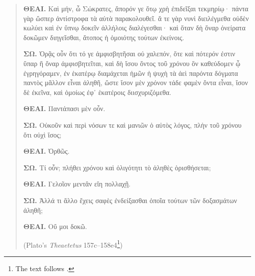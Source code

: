 \begin{quote}
{\textbf{ΘΕΑΙ.} Καὶ μήν, ὦ Σώκρατες, ἄπορόν γε ὅτῳ χρὴ ἐπιδεῖξαι τεκμηρίῳ· πάντα γὰρ ὥσπερ ἀντίστροφα τὰ αὐτὰ παρακολουθεῖ. ἅ τε γὰρ νυνὶ διειλέγμεθα οὐδὲν κωλύει καὶ ἐν ὕπνῳ δοκεῖν ἀλλήλοις διαλέγεσθαι· καὶ ὅταν δὴ ὄναρ ὀνείρατα δοκῶμεν διηγεῖσθαι, ἄτοπος ἡ ὁμοιότης τούτων ἐκείνοις.

\textbf{ΣΩ.} Ὁρᾷς οὖν ὅτι τό γε ἀμφισβητῆσαι οὐ χαλεπόν, ὅτε καὶ πότερόν ἐστιν ὕπαρ ἢ ὄναρ ἀμφισβητεῖται, καὶ δὴ ἴσου ὄντος τοῦ χρόνου ὃν καθεύδομεν ᾧ ἐγρηγόραμεν, ἐν ἑκατέρῳ διαμάχεται ἡμῶν ἡ ψυχὴ τὰ ἀεὶ παρόντα δόγματα παντὸς μᾶλλον εἶναι ἀληθῆ, ὥστε ἴσον μὲν χρόνον τάδε φαμὲν ὄντα εἶναι, ἴσον δὲ ἐκεῖνα, καὶ ὁμοίως ἐφ᾽ ἑκατέροις διισχυριζόμεθα.

\textbf{ΘΕΑΙ.} Παντάπασι μὲν οὖν.

\textbf{ΣΩ.} Οὐκοῦν καὶ περὶ νόσων τε καὶ μανιῶν ὁ αὐτὸς λόγος, πλὴν τοῦ χρόνου ὅτι οὐχὶ ἴσος;

\textbf{ΘΕΑΙ.} Ὀρθῶς.

\textbf{ΣΩ.} Τί οὖν; πλήθει χρόνου καὶ ὀλιγότητι τὸ ἀληθὲς ὁρισθήσεται;

\textbf{ΘΕΑΙ.} Γελοῖον μεντἂν εἴη πολλαχῇ.

\textbf{ΣΩ.} Ἀλλά τι ἄλλο ἔχεις σαφὲς ἐνδείξασθαι ὁποῖα τούτων τῶν δοξασμάτων ἀληθῆ;

\textbf{ΘΕΑΙ.} Οὔ μοι δοκῶ.} (Plato's \textit{Theaetetus} 157c--158e4\footnote{The text follows \cite{plato1995}.})
\end{quote}

